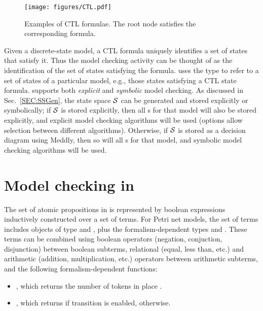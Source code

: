 \begin{figure}
  \centering
  \texttt{[image: figures/CTL.pdf]}
  \caption{Examples of CTL formulae. The root node satisfies the
  corresponding formula.}
  \label{FIG:CTLops}
\end{figure}

Given a discrete-state model, a CTL formula uniquely identifies a set of
states that satisfy it. Thus the model checking activity can be thought of
as the identification of the set of states satisfying the formula.
{\smart} uses the type  to refer to a set of states
of a particular model, e.g., those states satisfying a CTL state formula.
{\smart} supports both \emph{explicit} and \emph{symbolic} model checking.
As discussed in Sec.~\ref{SEC:SSGen},
the state space $\mathcal{S}$ can be generated and stored explicitly or symbolically;
if $\mathcal{S}$ is stored explicitly, then all s for that model
will also be stored explicitly,
and explicit model checking algorithms will be used
(options allow selection between different algorithms).
Otherwise, if $\mathcal{S}$ is stored as a decision diagram using Meddly,
then so will all s for that model,
and symbolic model checking algorithms will be used.



\section{Model checking in {\smart}}

The set of atomic propositions in {\smart} is represented by boolean
expressions inductively constructed over a set of terms. For Petri net
models, the set of terms includes objects of type  and
, plus the formalism-dependent types  and
. These terms can be combined using boolean operators
(negation, conjuction, disjunction) between boolean subterms, relational
(equal, less than, etc.) and arithmetic (addition, multiplication, etc.)
operators between arithmetic subterms, and the following
formalism-dependent functions: 
\begin{itemize} 
  \item {}, which returns the number of tokens in place . 
  \item {}, which returns  if transition
         is enabled,  otherwise. 
\end{itemize}

